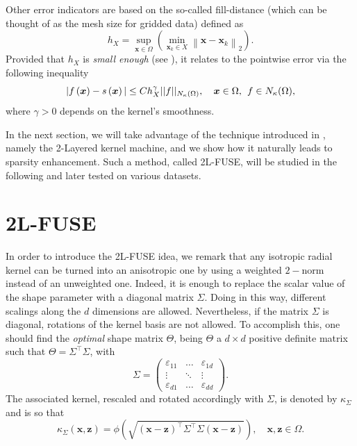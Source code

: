\documentclass[hyphens,a4paper,11pt]{article}
\newcommand{\mTheta}{\mathsf{\Theta}}
\newcommand{\mSigma}{\mathsf{\Sigma}}
\begin{document}
Other error indicators are based on the so-called fill-distance (which can be thought of as the mesh size for gridded data)  defined as
\begin{equation*}
 h_{X} =  \sup_{ \boldsymbol{x} \in \Omega} \left( \min_{ \boldsymbol{x}_k  \in {X}} \left\| \boldsymbol{x} - \boldsymbol{x}_k \right\|_2 \right).
\end{equation*}
Provided that $h_X$ is \textit{small enough} (see \cite[Theorem 3.2]{wendland2005scattered}), it relates to the pointwise error via the following inequality
\begin{equation}
	|f\left(\boldsymbol{x}\right)-s\left(\boldsymbol{x}\right) | \leq C h^{\gamma}_{X}  ||f||_{N_{\kappa}(\Omega)}, \quad \boldsymbol{x} \in \Omega,\hskip 0.15cm f \in N_{\kappa}(\Omega), 
\label{eq:bound_fill}
\end{equation}
where $\gamma>0$ depends on the kernel's smoothness.

In the next section, we will take advantage of the technique introduced in \cite{Wenzel}, namely the 2-Layered kernel machine, and we show how it naturally leads to sparsity enhancement. Such a method, called 2L-FUSE, will be studied in the following and later tested on various datasets. 

\section{2L-FUSE}
\label{2lfuse}

In order to introduce the 2L-FUSE idea, we remark that any isotropic radial kernel can be turned into an anisotropic one by using a weighted $2-$norm instead of an unweighted one. Indeed, it is enough to replace the scalar value of the shape parameter
with a diagonal matrix $\mSigma$. Doing in this way, different scalings along the $d$ dimensions are allowed. Nevertheless, if the matrix $\mSigma$ is diagonal, rotations of the kernel basis are not allowed. To accomplish this, one should find the \emph{optimal} shape matrix $\mTheta$, being $\mTheta$ a  $d \times d$ positive definite matrix such that $\mTheta=\mSigma^{\intercal}\mSigma$, with
\begin{equation*}
    \mSigma=
    \begin{pmatrix}
        \varepsilon_{11} & \dots & \varepsilon_{1d}\\
        \vdots & \ddots & \vdots \\
        \varepsilon_{d1} & \dots & \varepsilon_{dd}
    \end{pmatrix}.
\end{equation*}
The associated kernel, rescaled and rotated accordingly with $\mSigma$, is denoted by $\kappa_{\mSigma}$ and is so that
   \begin{equation} \label{eq:linear_two_layered_kernel}
 \kappa_{\mSigma}(\boldsymbol{x},\boldsymbol{z})= \phi( \sqrt{(\boldsymbol{x}-\boldsymbol{z})^{\intercal} \mSigma^{\intercal} \mSigma  (\boldsymbol{x}-\boldsymbol{z})}), \quad \boldsymbol{x}, \boldsymbol{z} \in \Omega.
    \end{equation}
\end{document}
